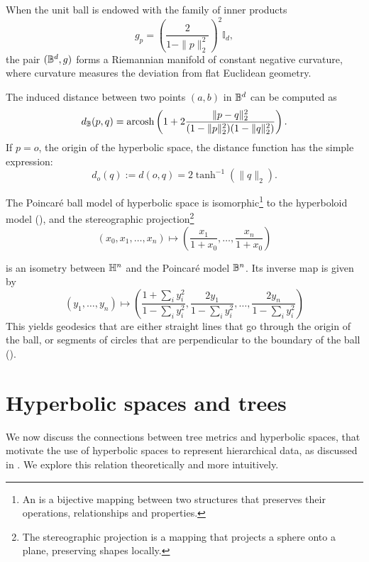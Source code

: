 When the unit ball is endowed with the family of inner products
\begin{equation*}
    g_p = \left(\frac{2}{1-\|p\|^2_2}\right)^2\mathbb{I}_d,
\end{equation*}
the pair $(\mathbb{B}^d,g)$ forms a Riemannian manifold of constant negative curvature, where curvature measures the deviation from flat Euclidean geometry.

The induced distance between two points $(a,b)$ in $\mathbb{B}^d$ can be computed as
\begin{equation*}
    d_{\mathbb{B}}(p,q) = \text{arcosh}\left(1 + 2\frac{\|p-q\|^2_2}{(1-\|p\|^2_2)(1-\|q\|^2_2)}\right).
\end{equation*}
If $p = o$, the origin of the hyperbolic space, the distance function has the simple expression:
\begin{equation*}
    d_o(q) := d(o, q) = 2\tanh^{-1}(\|q\|_2).
\end{equation*}




The Poincaré ball model of hyperbolic space is isomorphic\footnote{An  is a bijective mapping between two structures that preserves their operations, relationships and properties.} to the hyperboloid model (), and the stereographic projection\footnote{The stereographic projection is a mapping that projects a sphere onto a plane, preserving shapes locally.}
\begin{equation*}
    (x_0, x_1, \ldots, x_n) \mapsto \left(\frac{x_1}{1+x_0}, \ldots, \frac{x_n}{1+x_0}\right)
\end{equation*}

is an isometry between $\mathbb{H}^n$ and the Poincaré model $\mathbb{B}^n$. Its inverse map is given by
\begin{equation*}
    (y_1, \ldots, y_n) \mapsto \left(\frac{1 + \sum_i y_i^2}{1 - \sum_i y_i^2}, \frac{2y_1}{1 - \sum_i y_i^2}, \ldots, \frac{2y_n}{1 - \sum_i y_i^2}\right)
\end{equation*}
This yields geodesics that are either straight lines that go through the origin of the ball, or segments of circles that are perpendicular to the boundary of the ball ().





\section{Hyperbolic spaces and trees}
We now discuss the connections between tree metrics and hyperbolic spaces, that motivate the use of hyperbolic spaces to represent hierarchical data, as discussed in . We explore this relation theoretically and more intuitively.

